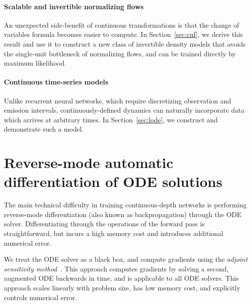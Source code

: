 \documentclass{article}
\begin{document}
\paragraph{Scalable and invertible normalizing flows}
An unexpected side-benefit of continuous transformations is that the change of variables formula becomes easier to compute.
In Section~\ref{sec:cnf}, we derive this result and use it to construct a new class of invertible density models that avoids the single-unit bottleneck of normalizing flows, and can be trained directly by maximum likelihood.

\paragraph{Continuous time-series models}
Unlike recurrent neural networks, which require discretizing observation and emission intervals, continuously-defined dynamics can naturally incorporate data which arrives at arbitrary times.
In Section~\ref{sec:lode}, we construct and demonstrate such a model.

\section{Reverse-mode automatic differentiation of ODE solutions}
\label{sec:rmd}
The main technical difficulty in training continuous-depth networks is performing reverse-mode differentiation (also known as backpropagation) through the ODE solver.
Differentiating through the operations of the forward pass is straightforward, but incurs a high memory cost and introduces additional numerical error.

We treat the ODE solver as a black box, and compute gradients using the \emph{adjoint sensitivity method}~\citep{pontryagin1962mathematical}.
This approach computes gradients by solving a second, augmented ODE backwards in time, and is applicable to all ODE solvers.
This approach scales linearly with problem size, has low memory cost, and explicitly controls numerical error.
\end{document}
